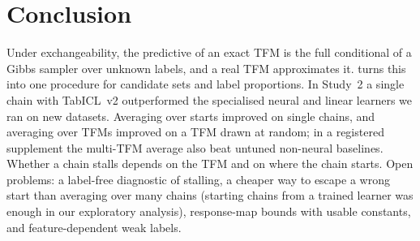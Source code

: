 \section{Conclusion}\label{sec:conclusion}
Under exchangeability, the predictive of an exact TFM is the full conditional of a Gibbs sampler over unknown labels,
and a real TFM approximates it. \ours{} turns this into one procedure for candidate sets and label proportions. In
Study~2 a single chain with TabICL~v2 outperformed the specialised neural and linear learners we ran on new datasets.
Averaging over starts
improved on single chains, and averaging over TFMs improved on a TFM drawn at random; in a registered supplement the
multi-TFM average also beat untuned non-neural baselines. Whether a chain stalls depends on the TFM and on where the
chain starts. Open problems: a label-free diagnostic of stalling, a cheaper way to escape a wrong start than averaging over many chains (starting
chains from a trained learner was enough in our exploratory analysis), response-map bounds with usable constants, and
feature-dependent weak labels.
